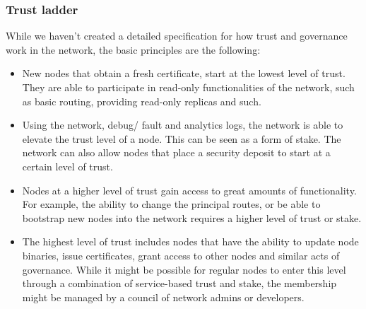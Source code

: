 \subsubsection{Trust ladder}
While we haven't created a detailed specification for how trust and governance work in the network, the basic principles
are the following:
\begin{itemize}
    \item New nodes that obtain a fresh certificate, start at the lowest level of trust. They are able to participate in
        read-only functionalities of the network, such as basic routing, providing read-only replicas and such.
    \item Using the network, debug/ fault and analytics logs, the network is able to elevate the trust level of a node.
        This can be seen as a form of stake. The network can also allow nodes that place a security deposit to start at
        a certain level of trust.
    \item Nodes at a higher level of trust gain access to great amounts of functionality. For example, the ability to
        change the principal routes, or be able to bootstrap new nodes into the network requires a higher level of trust
        or stake.
    \item The highest level of trust includes nodes that have the ability to update node binaries, issue certificates,
        grant access to other nodes and similar acts of governance. While it might be possible for regular nodes to
        enter this level through a combination of service-based trust and stake, the membership might be managed by a
        council of network admins or developers.
\end{itemize}
